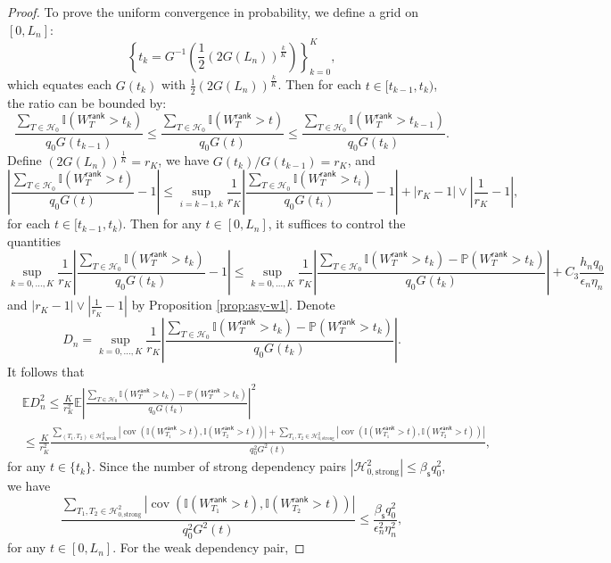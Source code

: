 \documentclass[12pt]{article}
\newcommand{\abs}[1]{\left\lvert#1\right\rvert}
\newcommand{\PP}{\mathbb{P}}
\newcommand{\E}{\mathbb{E}}
\newcommand{\cH}{\mathcal{H}}
\newcommand{\bbI}{\mathbb{I}}
\def\PP{{\mathbb P}}
\theoremstyle{plain}
\begin{document}
\begin{proof}
To prove the uniform convergence in probability, we define a grid on $[0,L_n]$:
$$\left\{ t_k= G^{-1}\left( \frac{1}{2} (2G(L_n))^{\frac{k}{K}} \right) \right\}_{k=0}^{K},  $$
which equates each $G(t_k)$ with $\frac{1}{2} (2G(L_n))^{\frac{k}{K}}$. Then for each $t\in [t_{k-1},t_{k})$, the ratio can be bounded by:
\begin{equation*}
    \frac{ \sum_{T\in\cH_0}\bbI(W_T^{\mathsf{rank} }>t_{k} ) }{q_0 G(t_{k-1}) } \le \frac{ \sum_{T\in\cH_0}\bbI(W_T^{\mathsf{rank} }>t ) }{q_0 G(t) } \le  \frac{ \sum_{T\in\cH_0}\bbI(W_T^{\mathsf{rank} }>t_{k-1} ) }{q_0 G(t_{k}) }.
\end{equation*}
Define $(2G(L_n))^{\frac{1}{K}}=r_K$, we have $G(t_k)/G(t_{k-1})=r_K$, and 
\begin{equation*}
    \abs{\frac{ \sum_{T\in\cH_0}\bbI(W_T^{\mathsf{rank} }>t ) }{q_0 G(t) } -1}\le \sup_{i=k-1,k}\frac{1}{r_K} \abs{\frac{ \sum_{T\in\cH_0}\bbI(W_T^{\mathsf{rank} }>t_i ) }{q_0 G(t_{i}) }-1} +\abs{r_K-1}\vee\abs{\frac{1}{r_K}-1 },
\end{equation*}
for each $t\in [t_{k-1},t_{k})$. Then for any $t\in [0,L_n]$, it suffices to control the quantities 
\begin{equation*}
    \sup_{k=0,\dots, K}\frac{1}{r_K} \abs{\frac{ \sum_{T\in\cH_0}\bbI(W_T^{\mathsf{rank} }>t_k ) }{q_0 G(t_{k}) }-1}\le  \sup_{k=0,\dots, K}\frac{1}{r_K} \abs{\frac{ \sum_{T\in\cH_0}\bbI(W_T^{\mathsf{rank} }>t_k )-\PP(W_T^{\mathsf{rank} }>t_k ) }{q_0 G(t_{k}) }} + C_3 \frac{h_n q_0}{\epsilon_n \eta_n }
\end{equation*}
and $\abs{r_K-1}\vee\abs{\frac{1}{r_K}-1 }$ by Proposition \ref{prop:asy-w1}.  Denote 
$$D_n=\sup\limits_{k=0,\dots, K}\frac{1}{r_K} \abs{\frac{ \sum_{T\in\cH_0}\bbI(W_T^{\mathsf{rank} }>t_k )-\PP(W_T^{\mathsf{rank} }>t_k ) }{q_0 G(t_{k}) }}.$$ 
It follows that
\begin{equation}
    \begin{aligned}
              &\E D_n^2\le \frac{K}{r_K^2}\E \abs{\frac{ \sum_{T\in\cH_0}\bbI(W_T^{\mathsf{rank} }>t_{k} )-\PP(W_T^{\mathsf{rank} }>t_{k} ) }{q_0 G(t_{k}) }}^2\\
              &\le  \frac{K}{r_K^2} \frac{\sum\limits_{(T_1,T_2)\in\cH^2_{0,\text{weak}}} \abs{\operatorname{cov}(\bbI(W_{T_1}^{\mathsf{rank} }>t),\bbI(W_{T_2}^{\mathsf{rank} }>t)) } +\sum\limits_{T_1,T_2\in\cH^2_{0,\text{strong}} } \abs{\operatorname{cov}(\bbI(W_{T_1}^{\mathsf{rank} }>t),\bbI(W_{T_2}^{\mathsf{rank} }>t)) } }{q_0^2 G^2(t) },
    \end{aligned}
\end{equation}
for any $t\in \{t_k\}$. Since the number of strong dependency pairs $\abs{\cH^2_{0,\text{strong}}}\le \beta_{\mathsf{s}}q_0^2 $, we have
\begin{equation*}
    \frac{\sum\limits_{T_1,T_2\in\cH^2_{0,\text{strong}} } \abs{\operatorname{cov}(\bbI(W_{T_1}^{\mathsf{rank} }>t),\bbI(W_{T_2}^{\mathsf{rank} }>t)) }}{q_0^2 G^2(t) }\le \frac{\beta_{\mathsf{s}}q_0^2 }{ \epsilon_n^2\eta_n^2},
\end{equation*}
for any $t\in [0,L_n]$. For the weak dependency pair, 


\end{proof}
\end{document}

